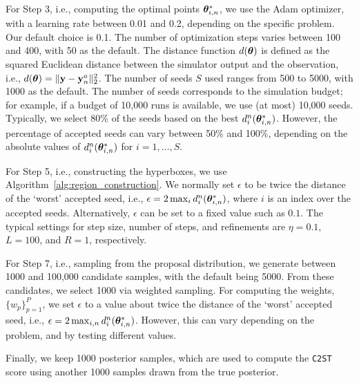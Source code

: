 For Step 3, i.e., computing the optimal points \(\boldsymbol{\theta}_{i,n}^*\), we use the Adam optimizer, with a learning rate between 0.01 and 0.2, depending on the specific problem. Our default choice is 0.1. The number of optimization steps varies between 100 and 400, with 50 as the  default. The distance function \(d(\boldsymbol{\theta})\) is defined as the squared Euclidean distance between the simulator output and the observation, i.e., \(d(\boldsymbol{\theta}) = \|\mathbf{y} - \mathbf{y}^o_n\|^2_2\).
The number of seeds \(S\) used ranges from 500 to 5000, with 1000 as the default. The number of seeds corresponds to the simulation budget; for example, if a budget of 10,000 runs is available, we use (at most) 10,000 seeds. Typically, we select 80\% of the seeds based on the best \(d_i^n(\boldsymbol{\theta}_{i,n}^*)\). However, the percentage of accepted seeds can vary between 50\% and 100\%, depending on the absolute values of \(d_i^n(\boldsymbol{\theta}_{i,n}^*)\) for \(i = 1, \dots, S\).

For Step 5, i.e., constructing the hyperboxes, we use Algorithm~\ref{alg:region_construction}. We normally set \(\epsilon\) to be twice the distance of the `worst' accepted seed, i.e., \(\epsilon = 2 \max_i d_i^n(\boldsymbol{\theta}_{i,n}^*)\), where \(i\) is an index over the accepted seeds. Alternatively, \(\epsilon\) can be set to a fixed value such as $0.1$. The typical settings for step size, number of steps, and refinements are \(\eta = 0.1\), \(L = 100\), and \(R = 1\), respectively.

For Step 7, i.e., sampling from the proposal distribution, we generate between 1000 and 100,000 candidate samples, with the default being 5000. From these candidates, we select 1000 via weighted sampling.
For computing the weights, $\{w_p\}_{p=1}^{P}$, we set $\epsilon$ to a value about twice the distance of the `worst' accepted seed, i.e., $\epsilon = 2 \max_{i,n} d_i^n(\boldsymbol{\theta}_{i,n}^*)$. However, this can vary depending on the problem, and by testing different values.

Finally, we keep 1000 posterior samples, which are used to compute the \texttt{C2ST} score using another 1000 samples drawn from the true posterior.

